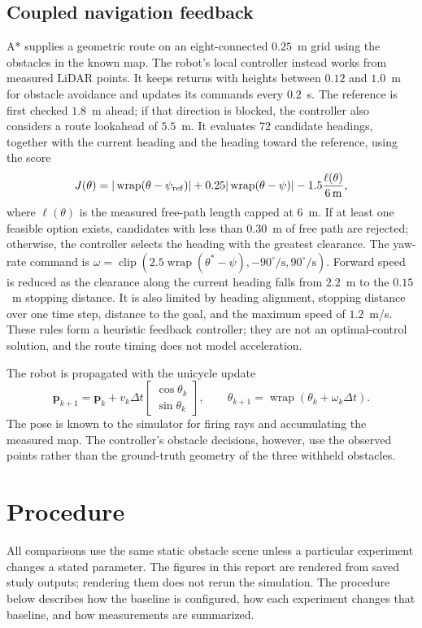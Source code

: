 \documentclass[11pt,letterpaper]{article}
\begin{document}
\subsection{Coupled navigation feedback}
A* supplies a geometric route on an eight-connected $0.25$~m grid using the obstacles in the known map. The robot's local controller instead works from measured LiDAR points. It keeps returns with heights between $0.12$ and $1.0$~m for obstacle avoidance and updates its commands every $0.2$~s. The reference is first checked $1.8$~m ahead; if that direction is blocked, the controller also considers a route lookahead of $5.5$~m. It evaluates 72 candidate headings, together with the current heading and the heading toward the reference, using the score
\[
J(\theta)=|\operatorname{wrap}(\theta-\psi_{\rm ref})|+0.25|\operatorname{wrap}(\theta-\psi)|-1.5\frac{\ell(\theta)}{6\,\mathrm m},
\]
where $\ell(\theta)$ is the measured free-path length capped at $6$~m. If at least one feasible option exists, candidates with less than $0.30$~m of free path are rejected; otherwise, the controller selects the heading with the greatest clearance. The yaw-rate command is $\omega=\operatorname{clip}(2.5\operatorname{wrap}(\theta^*-\psi),-90^\circ/\mathrm{s},90^\circ/\mathrm{s})$. Forward speed is reduced as the clearance along the current heading falls from $2.2$~m to the $0.15$~m stopping distance. It is also limited by heading alignment, stopping distance over one time step, distance to the goal, and the maximum speed of $1.2$~m/s. These rules form a heuristic feedback controller; they are not an optimal-control solution, and the route timing does not model acceleration.

The robot is propagated with the unicycle update
\begin{equation}\label{eq:robot}
\mathbf p_{k+1}=\mathbf p_k+v_k\Delta t\begin{bmatrix}\cos\theta_k\\\sin\theta_k\end{bmatrix},\qquad
\theta_{k+1}=\operatorname{wrap}(\theta_k+\omega_k\Delta t).
\end{equation}
The pose is known to the simulator for firing rays and accumulating the measured map. The controller's obstacle decisions, however, use the observed points rather than the ground-truth geometry of the three withheld obstacles.

\section{Procedure}\label{sec:procedure}
All comparisons use the same static obstacle scene unless a particular experiment changes a stated parameter. The figures in this report are rendered from saved study outputs; rendering them does not rerun the simulation. The procedure below describes how the baseline is configured, how each experiment changes that baseline, and how measurements are summarized.
\end{document}
